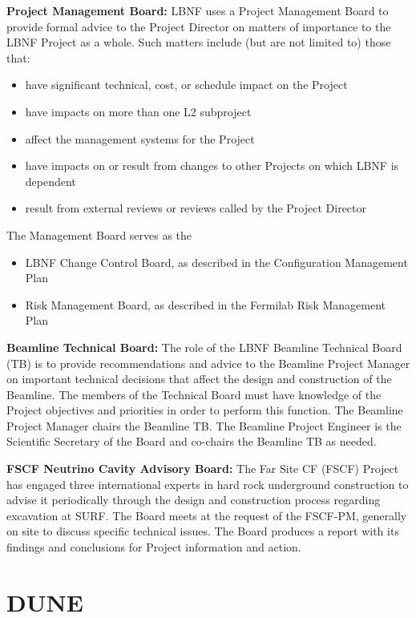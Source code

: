 \textbf{Project Management Board:} LBNF uses a Project Management Board to provide formal advice to the Project Director on matters of importance to the LBNF Project as a whole. Such matters include (but are not limited to) those that:
\begin{itemize}
\item have significant technical, cost, or schedule impact on the Project
\item have impacts on more than one L2 subproject
\item affect the management systems for the Project
\item have impacts on or result from changes to other Projects on which LBNF is dependent
\item result from external reviews or reviews called by the Project Director
\end{itemize}
The Management Board serves as the
\begin{itemize}
\item LBNF Change Control Board, as described in the Configuration Management Plan \fixme{[ref]}
\item Risk Management Board, as described in the Fermilab Risk Management Plan  \fixme{[ref]}
\end{itemize}

\textbf{Beamline Technical Board:} The role of the LBNF Beamline Technical Board (TB) is to provide recommendations and advice to the Beamline Project Manager on important technical decisions that affect the design and construction of the Beamline. The members of the Technical Board must have knowledge of the Project objectives and priorities in order to perform this function. The Beamline Project Manager chairs the Beamline TB. The Beamline Project Engineer is the Scientific Secretary of the Board and co-chairs the Beamline TB as needed. 

\textbf{FSCF Neutrino Cavity Advisory Board:} The Far Site CF (FSCF) Project has engaged three international experts in hard rock underground construction to advise it periodically through the design and construction process regarding excavation at SURF. The Board meets at the request of the FSCF-PM, generally on site to discuss specific technical issues. The Board produces a report with its findings and conclusions for Project information and action. 

\section{DUNE}

